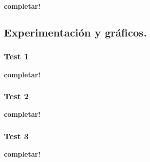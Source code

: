 \vspace*{0.3cm}

\textbf{completar!}



\newpage
\subsection{Experimentación y gráficos.}

\vspace*{0.3cm}

\subsubsection{Test 1}

\vspace*{0.3cm}

\textbf{completar!}


\newpage
\subsubsection{Test 2}

\vspace*{0.3cm}

\textbf{completar!}


\newpage
\subsubsection{Test 3}

\vspace*{0.3cm}

\textbf{completar!}
